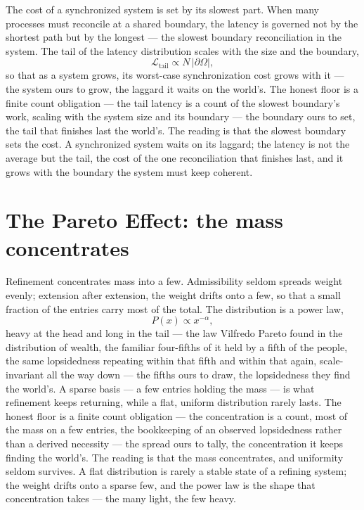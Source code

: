The cost of a synchronized system is set by its slowest part. When many processes must reconcile at a shared
boundary, the latency is governed not by the shortest path but by the longest --- the slowest boundary
reconciliation in the system. The tail of the latency distribution scales with the size and the boundary,
\begin{equation}
  \mathcal{L}_{\text{tail}} \propto N\,|\partial\Omega|,
\end{equation}
so that as a system grows, its worst-case synchronization cost grows with it --- the system ours to grow, the
laggard it waits on the world's. The honest floor is a finite
count obligation --- the tail latency is a count of the slowest boundary's work, scaling with the system size
and its boundary --- the boundary ours to set, the tail that finishes last the world's. The reading is that
the slowest boundary sets the cost. A synchronized system waits on its
laggard; the latency is not the average but the tail, the cost of the one reconciliation that finishes last,
and it grows with the boundary the system must keep coherent.

\section{The Pareto Effect: the mass concentrates}
\label{se:pareto}

Refinement concentrates mass into a few. Admissibility seldom spreads weight evenly; extension after
extension, the weight drifts onto a few, so that a small fraction of the entries carry most of the total. The distribution is a
power law,
\begin{equation}
  P(x) \propto x^{-\alpha},
\end{equation}
heavy at the head and long in the tail --- the law Vilfredo Pareto found in the distribution of wealth, the
familiar four-fifths of it held by a fifth of the people, the same lopsidedness repeating within that fifth
and within that again, scale-invariant all the way down --- the fifths ours to draw, the lopsidedness they
find the world's. A sparse basis --- a few entries holding the mass ---
is what refinement keeps returning, while a flat, uniform distribution rarely lasts. The honest floor is a
finite count
obligation --- the concentration is a count, most of the mass on a few entries, the bookkeeping of an observed
lopsidedness rather than a derived necessity --- the spread ours to tally, the concentration it keeps finding
the world's. The reading is that the mass concentrates, and uniformity seldom survives. A
flat distribution is rarely a stable state of a refining system; the weight drifts onto a sparse
few, and the power law is the shape that concentration takes --- the many light, the few heavy.

